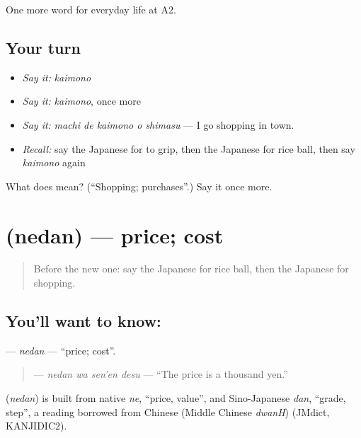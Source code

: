 \begin{grammarlens}[title={What you've built}]
One more word for everyday life at A2.
\end{grammarlens}

\subsection*{Your turn}
\begin{itemize}
\raggedright
  \item \emph{Say it:} \emph{kaimono}
  \item \emph{Say it:} \emph{kaimono}, once more
  \item \emph{Say it:} \emph{machi de kaimono o shimasu} — I go shopping in town.
  \item \emph{Recall:} say the Japanese for to grip, then the Japanese for rice ball, then say \emph{kaimono} again
\end{itemize}

\begin{tcolorbox}[breakable,colback=teal!4,colframe=teal!35!black,title={Before you move on}]
What does  mean? (\textquotedblleft{}Shopping; purchases\textquotedblright{}.) Say it once more.
\end{tcolorbox}
\section[\texorpdfstring{\ja{ねだん} (nedan)}{ねだん (nedan)}]{ (nedan) — price; cost}

\label{lesson:JA-C181-nedan}



\begin{quote}
Before the new one: say the Japanese for rice ball, then the Japanese for shopping.
\end{quote}

\subsection*{You'll want to know: }
\textbf{} — \emph{nedan} — \textquotedblleft{}price; cost\textquotedblright{}.

\begin{quote}
\textbf{ } — \emph{nedan wa sen'en desu} — \textquotedblleft{}The price is a thousand yen.\textquotedblright{}
\end{quote}

\begin{cousinweb}
\textbf{} (\emph{nedan}) is built from native \emph{ne}, \textquotedblleft{}price, value\textquotedblright{}, and Sino-Japanese \emph{dan}, \textquotedblleft{}grade, step\textquotedblright{}, a reading borrowed from Chinese (Middle Chinese \emph{dwanH}) (JMdict, KANJIDIC2).
\end{cousinweb}

